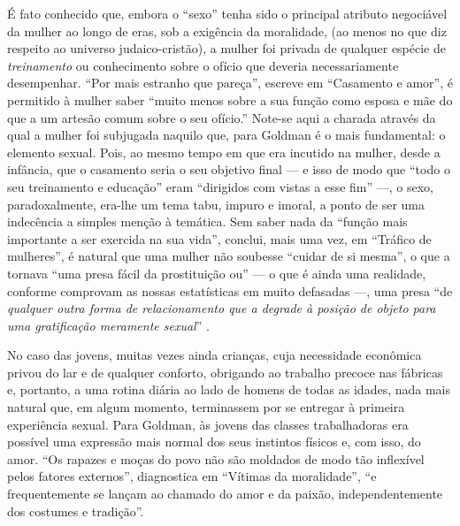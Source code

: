 É fato conhecido que, embora o ``sexo'' tenha
sido o principal atributo negociável da mulher ao longo de eras, sob a
exigência da moralidade, (ao menos no que diz respeito ao universo
judaico-cristão), a mulher foi privada de qualquer espécie de
\textit{treinamento} ou conhecimento sobre o ofício que
deveria necessariamente desempenhar. ``Por mais estranho que pareça'',
escreve em ``Casamento e amor'', é permitido à mulher saber ``muito
menos sobre a sua função como esposa e mãe do que a um artesão comum
sobre o seu ofício.'' Note-se aqui a charada através da qual a mulher
foi subjugada naquilo que, para Goldman é o mais fundamental: o elemento
sexual. Pois, ao mesmo tempo em que era incutido na mulher, desde a
infância, que o casamento seria o seu objetivo final --- e isso de modo
que ``todo o seu treinamento e educação'' eram ``dirigidos com vistas a
esse fim'' ---, o sexo, paradoxalmente, era-lhe um tema tabu, impuro e
imoral, a ponto de ser uma indecência a simples menção à temática. Sem
saber nada da ``função mais importante a ser exercida na sua vida'',
conclui, mais uma vez, em ``Tráfico de mulheres'', é natural que uma
mulher não soubesse ``cuidar de si mesma'', o que a tornava ``uma presa
fácil da prostituição ou'' --- o que é ainda uma realidade, conforme
comprovam as nossas estatísticas em muito defasadas ---, uma presa ``de
\textit{qualquer outra forma de relacionamento que a degrade à posição de
objeto para uma gratificação meramente sexual}'' .

No caso das jovens, muitas vezes ainda crianças, cuja necessidade
econômica privou do lar e de qualquer conforto, obrigando ao trabalho
precoce nas fábricas e, portanto, a uma rotina diária ao lado de homens
de todas as idades, nada mais natural que, em algum momento, terminassem
por se entregar à primeira experiência sexual. Para Goldman, às jovens
das classes trabalhadoras era possível uma expressão mais normal dos
seus instintos físicos e, com isso, do amor. ``Os rapazes e moças do
povo não são moldados de modo tão inflexível pelos fatores externos'',
diagnostica em ``Vítimas da moralidade'', ``e frequentemente se lançam
ao chamado do amor e da paixão, independentemente dos costumes e
tradição''. 

